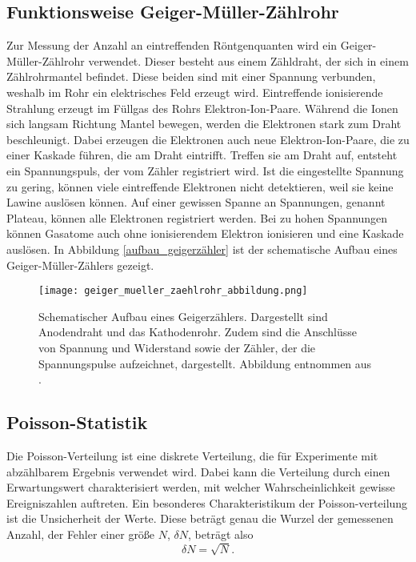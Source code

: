 \subsection{Funktionsweise Geiger-Müller-Zählrohr}
Zur Messung der Anzahl an eintreffenden Röntgenquanten wird ein Geiger-Müller-Zählrohr verwendet. Dieser besteht aus einem Zähldraht, der sich in einem Zählrohrmantel befindet. Diese beiden sind mit einer Spannung verbunden, weshalb im Rohr ein elektrisches Feld erzeugt wird. Eintreffende ionisierende Strahlung erzeugt im Füllgas des Rohrs Elektron-Ion-Paare. Während die Ionen sich langsam Richtung Mantel bewegen, werden die Elektronen stark zum Draht beschleunigt. Dabei erzeugen die Elektronen auch neue Elektron-Ion-Paare, die zu einer Kaskade führen, die am Draht eintrifft. Treffen sie am Draht auf, entsteht ein Spannungspuls, der vom Zähler registriert wird. Ist die eingestellte Spannung zu gering, können viele eintreffende Elektronen nicht detektieren, weil sie keine Lawine auslösen können. Auf einer gewissen Spanne an Spannungen, genannt Plateau, können alle Elektronen registriert werden. Bei zu hohen Spannungen können Gasatome auch ohne ionisierendem Elektron ionisieren und eine Kaskade auslösen. \cite{geigerzähler}
In Abbildung \autoref{aufbau_geigerzähler} ist der schematische Aufbau eines Geiger-Müller-Zählers gezeigt. 
\begin{figure}[H]
	\centering
	\texttt{[image: geiger\_mueller\_zaehlrohr\_abbildung.png]}
	\caption{Schematischer Aufbau eines Geigerzählers. Dargestellt sind Anodendraht und das Kathodenrohr. Zudem sind die Anschlüsse von Spannung und Widerstand sowie der Zähler, der die Spannungspulse aufzeichnet, dargestellt. Abbildung entnommen aus \cite{geigerzähler_bildl}. }
	\label{aufbau_geigerzähler}
\end{figure}



\subsection{Poisson-Statistik}
Die Poisson-Verteilung ist eine diskrete Verteilung, die für Experimente mit abzählbarem Ergebnis verwendet wird. Dabei kann die Verteilung durch einen Erwartungswert charakterisiert werden, mit welcher Wahrscheinlichkeit gewisse Ereigniszahlen auftreten. Ein besonderes Charakteristikum der Poisson-verteilung ist die Unsicherheit der Werte. Diese beträgt genau die Wurzel der gemessenen Anzahl, der Fehler einer größe $N$, $\delta N$, beträgt also 
$$\delta N=\sqrt{N}. $$










